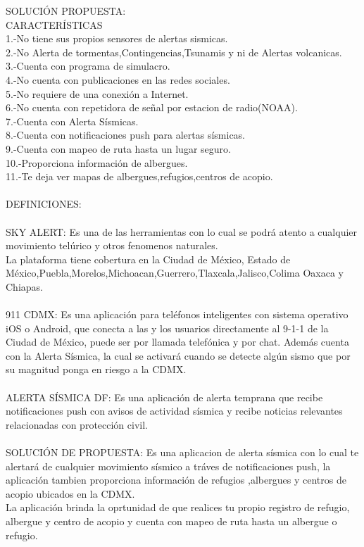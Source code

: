 SOLUCIÓN PROPUESTA:\\CARACTERÍSTICAS\\1.-No tiene sus propios sensores de alertas sismicas.\\2.-No Alerta de tormentas,Contingencias,Tsunamis y ni de Alertas volcanicas.\\3.-Cuenta con programa de simulacro.\\4.-No cuenta con publicaciones en las redes sociales.\\5.-No requiere de una conexión a Internet.\\6.-No cuenta con repetidora de señal por estacion de radio(NOAA).\\7.-Cuenta con Alerta Sísmicas.\\8.-Cuenta con notificaciones push para alertas sísmicas.\\9.-Cuenta con mapeo de ruta hasta un lugar seguro.\\10.-Proporciona información de albergues.\\11.-Te deja ver mapas de albergues,refugios,centros de acopio.\\
\\
DEFINICIONES:\\ \\
SKY ALERT: Es una de las herramientas con lo cual se podrá atento a cualquier movimiento telúrico y otros fenomenos naturales.\\ La plataforma tiene cobertura en la Ciudad de México, Estado de México,Puebla,Morelos,Michoacan,Guerrero,Tlaxcala,Jalisco,Colima Oaxaca  y Chiapas.\\
\\
911 CDMX: Es una aplicación para teléfonos inteligentes con sistema operativo iOS o Android, que conecta a las y los usuarios directamente al 9-1-1 de la Ciudad de México, puede ser por llamada telefónica y por chat. Además cuenta con la Alerta Sísmica, la cual se activará cuando se detecte algún sismo que por su magnitud ponga en riesgo a la CDMX.\\
\\
ALERTA SÍSMICA DF: Es una aplicación de alerta temprana que recibe notificaciones push con avisos de actividad sísmica y recibe noticias relevantes relacionadas con protección civil.\\
\\
SOLUCIÓN DE PROPUESTA: Es una aplicacion de alerta sísmica con lo cual te alertará de cualquier movimiento sísmico a tráves de notificaciones push, la aplicación tambien proporciona información de refugios ,albergues y centros de acopio ubicados en la CDMX.\\La aplicación brinda la oprtunidad de que realices tu propio registro de refugio, albergue y centro de acopio y cuenta con mapeo de ruta hasta un albergue o refugio.
